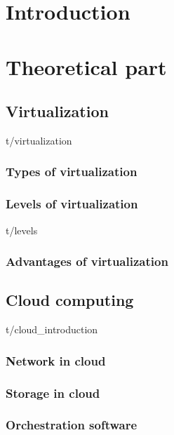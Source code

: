 \documentclass[12pt,oneside,a4paper]{report} %
\begin{document}
\tableofcontents
\cleardoublepage


\pagestyle{plain}

\chapter{Introduction}

\chapter{Theoretical part}
	\section{Virtualization}
		{t/virtualization}

		\subsection{Types of virtualization}
		\subsection{Levels of virtualization}
			{t/levels}
		\subsection{Advantages of virtualization}
		\label{subsec:advantages-of-virtualization}
	\section{Cloud computing}
		{t/cloud_introduction}


		\subsection{Network in cloud}
		\subsection{Storage in cloud}

		\subsection{Orchestration software}
\end{document}
